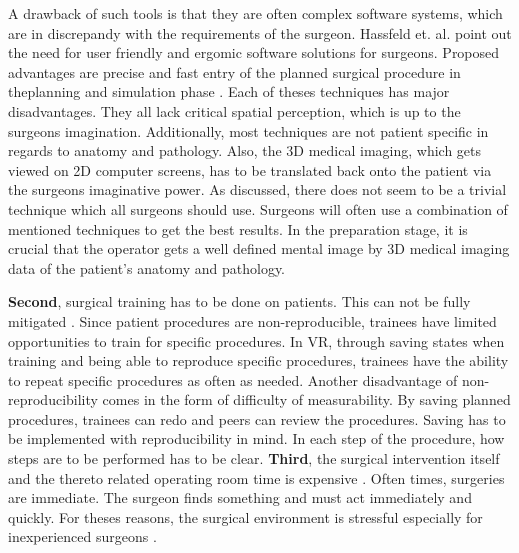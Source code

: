 A drawback of such tools is that they are often complex software systems, which are in discrepandy with the requirements of the surgeon.
Hassfeld et. al. point out the need for user friendly and ergomic software solutions for surgeons.
Proposed advantages are precise and fast entry of the planned surgical procedure in theplanning and simulation phase \cite{HASSFELD20012}.
\newline
Each of theses techniques has major disadvantages.
They all lack critical spatial perception, which is up to the surgeons imagination.
Additionally, most techniques are not patient specific in regards to anatomy and pathology.
Also, the 3D medical imaging, which gets viewed on 2D computer screens, has to be translated back onto the patient via the surgeons imaginative power. 
As discussed, there does not seem to be a trivial technique which all surgeons should use.
Surgeons will often use a combination of mentioned techniques to get the best results.
In the preparation stage, it is crucial that the operator gets a well defined mental image by 3D medical imaging data of the patient's anatomy and pathology.

\textbf{Second}, surgical training has to be done on patients.
This can not be fully mitigated \cite{mcgaghie2011does}.
\newline
Since patient procedures are non-reproducible, trainees have limited opportunities to train for specific procedures.
In VR, through saving states when training and being able to reproduce specific procedures, trainees have the ability to repeat specific procedures as often as needed.
\newline
Another disadvantage of non-reproducibility comes in the form of difficulty of measurability.
By saving planned procedures, trainees can redo and peers can review the procedures.
Saving has to be implemented with reproducibility in mind.
In each step of the procedure, how steps are to be performed has to be clear.
\newline
\textbf{Third}, the surgical intervention itself and the thereto related operating room time is expensive \cite{Barber.2020}.
Often times, surgeries are immediate.
The surgeon finds something and must act immediately and quickly.
For theses reasons, the surgical environment is stressful especially for inexperienced surgeons \cite{schuetz2008three}.